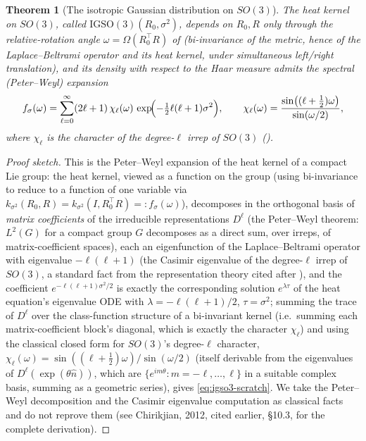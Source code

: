 \documentclass[11pt,a4paper]{report}
\newtheorem{theorem}{Theorem}[chapter]
\theoremstyle{definition}
\theoremstyle{remark}
\begin{document}
\begin{theorem}[The isotropic Gaussian distribution on $SO(3)$]
\label{thm:igso3-scratch}
The heat kernel on $SO(3)$, called $\mathrm{IGSO}(3)(R_0,\sigma^2)$, depends
on $R_0,R$ only through the relative-rotation angle
$\omega=\Omega(R_0^\top R)$ of  (bi-invariance of
the metric, hence of the Laplace--Beltrami operator and its heat kernel,
under simultaneous left/right translation), and its density with respect
to the Haar measure admits the spectral (Peter--Weyl) expansion
\begin{equation}
\label{eq:igso3-scratch}
f_\sigma(\omega)
=
\sum_{\ell=0}^{\infty}(2\ell+1)\,\chi_\ell(\omega)\,\exp\!\Bigl(-\tfrac12\ell(\ell+1)\sigma^2\Bigr),
\qquad
\chi_\ell(\omega) = \frac{\sin\bigl((\ell+\tfrac12)\omega\bigr)}{\sin(\omega/2)} ,
\end{equation}
where $\chi_\ell$ is the character of the degree-$\ell$ irrep of $SO(3)$
().
\end{theorem}

\begin{proof}[Proof sketch]
This is the Peter--Weyl expansion of the heat kernel of a compact Lie
group: the heat kernel, viewed as a function on the group (using
bi-invariance to reduce to a function of one variable via
$k_{\sigma^2}(R_0,R)=k_{\sigma^2}(I,R_0^\top R)=:f_\sigma(\omega)$), decomposes
in the orthogonal basis of \emph{matrix coefficients} of the irreducible
representations $D^\ell$ (the Peter--Weyl theorem: $L^2(G)$ for a compact
group $G$ decomposes as a direct sum, over irreps, of matrix-coefficient
spaces), each an eigenfunction of the Laplace--Beltrami operator with
eigenvalue $-\ell(\ell+1)$ (the Casimir eigenvalue of the degree-$\ell$
irrep of $SO(3)$, a standard fact from the representation theory cited
after ), and the coefficient
$e^{-\ell(\ell+1)\sigma^2/2}$ is exactly the corresponding solution
$e^{\lambda\tau}$ of the heat equation's eigenvalue ODE with
$\lambda=-\ell(\ell+1)/2$, $\tau=\sigma^2$; summing the trace of $D^\ell$
over the class-function structure of a bi-invariant kernel (i.e.\ summing
each matrix-coefficient block's diagonal, which is exactly the character
$\chi_\ell$) and using the classical closed form for $SO(3)$'s degree-$\ell$
character, $\chi_\ell(\omega)=\sin((\ell+\tfrac12)\omega)/\sin(\omega/2)$
(itself derivable from the eigenvalues of $D^\ell(\exp(\theta\widehat n))$,
which are $\{e^{im\theta}:m=-\ell,\dots,\ell\}$ in a suitable complex basis,
summing as a geometric series), gives \eqref{eq:igso3-scratch}. We take the
Peter--Weyl decomposition and the Casimir eigenvalue computation as
classical facts and do not reprove them (see Chirikjian, 2012, cited
earlier, \S10.3, for the complete derivation).
\end{proof}
\end{document}
